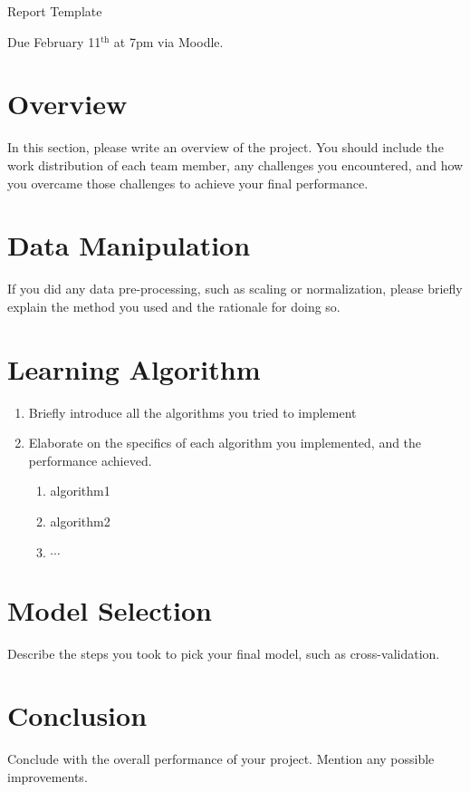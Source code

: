 



\pagestyle{fancy}

\LARGE
\begin{center}
Report Template

\large
Due February 11$^{\text{th}}$ at 7pm via Moodle.
\end{center}

\normalsize
\medskip

\section{Overview}
In this section, please write an overview of the project. You should include the work distribution of each team member, any challenges you encountered, and how you overcame those challenges to achieve your final performance.


\section{Data Manipulation}
If you did any data pre-processing, such as scaling or normalization,  please briefly explain the method you used and the rationale for doing so.

\section{Learning Algorithm}
\begin{enumerate}
\item Briefly introduce all the algorithms you tried to implement
\item Elaborate on the specifics of each algorithm you implemented, and the performance achieved.
\begin{enumerate}
\item algorithm1
\item algorithm2
\item $\cdots$
\end{enumerate}
\end{enumerate}


\section{Model Selection}
Describe the steps you took to pick your final model, such as cross-validation.

\section{Conclusion}
Conclude with the overall performance of your project. Mention any possible improvements.



